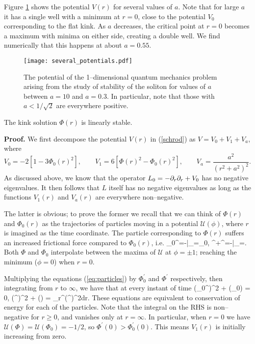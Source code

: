 Figure \ref{fig:several_potentials} shows the potential $V(r)$ for several values of $a$. Note that for large $a$ it has a single well with a minimum at $r=0$, close to the potential $V_0$ corresponding to the flat kink. As $a$ decreases, the critical point at $r=0$ becomes a maximum with minima on either side, creating a double well. We find numerically that this happens at about $a=0.55$.

\begin{figure}
\texttt{[image: several\_potentials.pdf]}
\caption{\label{fig:several_potentials}The potential of the 1--dimensional quantum mechanics problem arising from the study of stability of the soliton for values of $a$ between $a=10$ and $a=0.3$. In particular, note that those with $a<1/\sqrt{2}$ are everywhere positive.}
\end{figure}

\begin{prop}
The kink solution $\Phi(r)$ is linearly stable.
\end{prop} 

{\bf Proof.} We first decompose the potential $V(r)$ in (\ref{schrod}) as $V=V_0+V_1+V_a$, where
\[
V_0 = -2[1-3\Phi_0(r)^2],\qquad 
V_1 = 6[\Phi(r)^2-\Phi_0(r)^2],\qquad V_a = \frac{a^2}{(r^2+a^2)^2}.
\]
As discussed above, we know that the operator $L_0 = -\partial_r\partial_r + V_0$ has no negative eigenvalues. It then follows that $L$ itself has no negative eigenvalues as long as the functions $V_1(r)$ and $V_a(r)$ are everywhere non--negative.

The latter is obvious; to prove the former we recall that we can think of $\Phi(r)$ and $\Phi_0(r)$ as the trajectories of particles moving in a potential $\mathcal{U}(\phi)$, where $r$ is imagined as the time coordinate. The particle corresponding to $\Phi(r)$ suffers an increased frictional force compared to $\Phi_0(r)$, i.e.
\be
\label{eq:particles}
\Phi_0^{\prime\prime}=-\bigg|_{\phi=\Phi_0},\qquad
\Phi^{\prime\prime}+\Phi^\prime=-\bigg|_{\phi=\Phi}.
\ee
Both $\Phi$ and $\Phi_0$ interpolate between the maxima of $\mathcal{U}$ at $\phi=\pm 1$; reaching the minimum ($\phi=0$) when $r=0$.

Multiplying the equations (\ref{eq:particles}) by $\Phi_0^\prime$ and $\Phi^\prime$ respectively, then integrating from $r$ to $\infty$, we have that at every instant of time
\be
\label{eq:energy}
(\Phi_0^\prime)^2 + (\Phi_0) = 0,\qquad
{}(\Phi^\prime)^2 + (\Phi) = \int_r^\infty{}(\Phi^\prime)^2dr.
\ee
These equations are equivalent to conservation of energy for each of the particles. Note that the integral on the RHS is non--negative for $r\geq 0$, and vanishes only at $r=\infty$. In particular, when $r=0$ we have $\mathcal{U}(\Phi)=\mathcal{U}(\Phi_0)=-1/2$, so $\Phi^\prime(0)>\Phi_0^\prime(0)$. This means $V_1(r)$ is initially increasing from zero.

